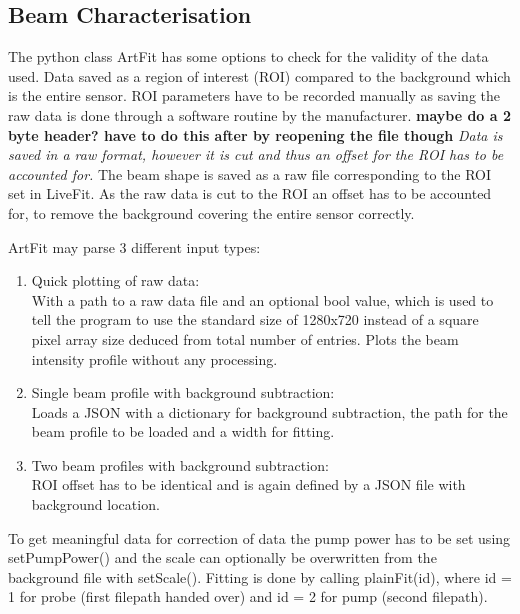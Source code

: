 \documentclass[twoside,openright]{scrreprt}
\begin{document}
\subsection{Beam Characterisation}
The python class ArtFit has some options to check for the validity of the data used. Data saved as a region of interest (ROI) compared to the background which is the entire sensor. ROI parameters have to be recorded manually as saving the raw data is done through a software routine by the manufacturer. \textbf{maybe do a 2 byte header? have to do this after by reopening the file though} \textit{Data is saved in a raw format, however it is cut and thus an offset for the ROI has to be accounted for.} The beam shape is saved as a raw file corresponding to the ROI set in LiveFit. As the raw data is cut to the ROI an offset has to be accounted for, to remove the background covering the entire sensor correctly.

ArtFit may parse 3 different input types:
\begin{enumerate}
\item Quick plotting of raw data:\\
With a path to a raw data file and an optional bool value, which is used to tell the program to use the standard size of 1280x720 instead of a square pixel array size deduced from total number of entries. Plots the beam intensity profile without any processing.
\item Single beam profile with background subtraction: \\
Loads a JSON with a dictionary for background subtraction, the path for the beam profile to be loaded and a width for fitting.
\item Two beam profiles with background subtraction: \\
ROI offset has to be identical and is again defined by a JSON file with background location.
\end{enumerate}

To get meaningful data for correction of data the pump power has to be set using setPumpPower() and the scale can optionally be overwritten from the background file with setScale(). Fitting is done by calling plainFit(id), where id = 1 for probe (first filepath handed over) and id = 2 for pump (second filepath).
\end{document}
